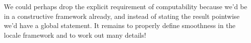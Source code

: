 \documentclass[14pt]{extarticle}
\begin{document}
We could perhaps drop the explicit requirement of computability because we'd be in a constructive framework already, and instead of stating the result pointwise we'd have a global statement. It remains to properly define smoothness in the locale framework and to work out many details!

\begin{comment}
How Kurtz randomness fails the LLN (see \cite{NiesAndre2009CaR}, Section 3.5). 

Paper: locale theory
- Is the relationship between nucleus and quotient always just that each set gets mapped to its value under the nucleus? The nucleus map is the quotient map?
- Ran, the sublocale of random points
- presumably we can say some class of functions are smooth on this sublocale?
- Porter provides some justification for the locale approach since it's "all measure 1 properties"
- are there countable bounds on the collections, in the locale theory?
- given some notion of randomness, the interval [0,1] can be given the corresponding locale structure
- does this mean that each notion of randomness has its own topology? or are the topologies the same just with different numbers of points, and different Ran? (must be a different topology, right? because once you have a point you have an ideal of open sets, else not)
- what corresponds to the different amounts of computability and/or martingale bounds?
- will the punch line be that the locale approach is agnostic to which definition of randomness we work with, but simply takes any of the notions and removes random points from the space?
- how does the existence of a universal ML test play out in locales?
- the a.e. results like "if f is nondecreasing then it is smooth at every computable random" feel like statements about cohesion, and this feels natural in the locale interpretation
- she is saying that Birkhoff Ergodicity theorem, suitably effectivized, holds at ML randoms, i.e. the same set that functions of bounded variation are smooth at -- making them "equally strong". But in another sense these are different topologies on R and so we can also say that given this topology these are the classes of functions.
- Church's thesis that there are no non-computable reals -- has a natural home here.
\end{comment}


\end{document}
